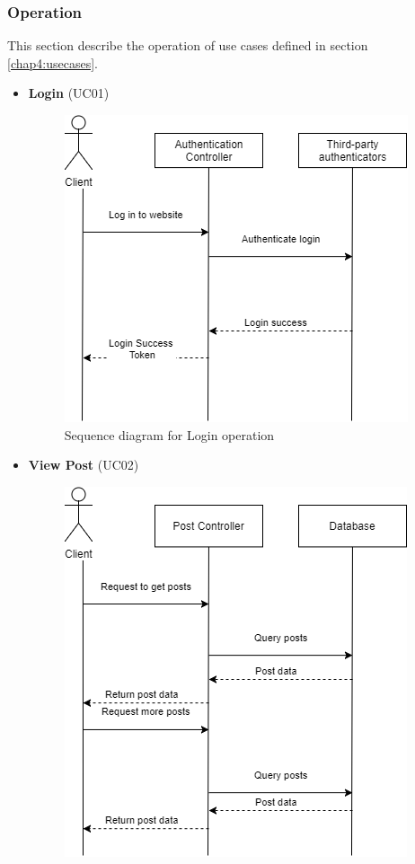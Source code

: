 \subsubsection{Operation}
This section describe the operation of use cases defined in section \ref{chap4:usecases}.
\begin{itemize}
	\item \textbf{Login} (UC01)
	\begin{center}
		\begin{figure}[H]
		\centering
		\includegraphics[width=0.75\columnwidth]{images/chap4/login_sequence.png}
		\caption{Sequence diagram for Login operation}
		\end{figure}
	\end{center}
	\item \textbf{View Post} (UC02)
	\begin{center}
		\begin{figure}[H]
		\centering
		\includegraphics[width=0.75\columnwidth]{images/chap4/post_sequence.png}

\end{figure}
\end{center}
\end{itemize}
